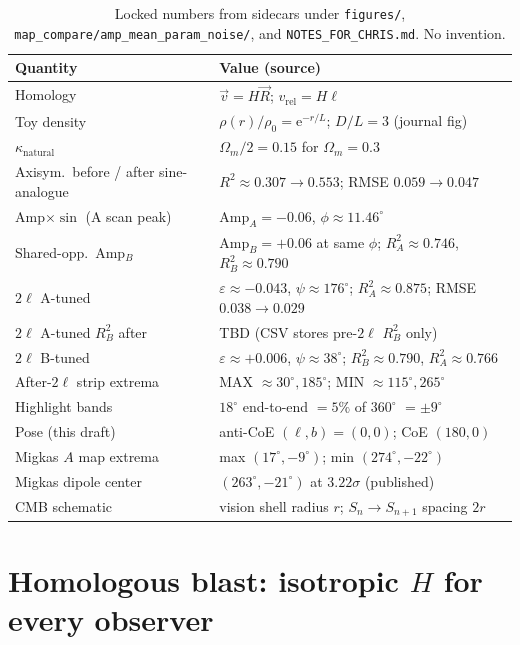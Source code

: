 \documentclass[11pt,letterpaper]{article}
\begin{document}
\begin{table}[ht]
\centering
\caption{Locked numbers from sidecars under
\texttt{figures/}, \texttt{map\_compare/amp\_mean\_param\_noise/}, and
\texttt{NOTES\_FOR\_CHRIS.md}. No invention.}
\label{tab:locked}
\begin{tabular}{@{}ll@{}}
\toprule
Quantity & Value (source) \\
\midrule
Homology & $\vec{v}=H\vec{R}$; $v_{\mathrm{rel}}=H\ell$ \\
Toy density & $\rho(r)/\rho_0=\mathrm{e}^{-r/L}$; $D/L=3$ (journal fig) \\
$\kappa_{\mathrm{natural}}$ & $\Omega_m/2=0.15$ for $\Omega_m=0.3$ \\
Axisym.\ before / after sine-analogue & $R^2\approx0.307\to0.553$; RMSE $0.059\to0.047$ \\
Amp$\times\sin$ (A scan peak) & $\mathrm{Amp}_A=-0.06$, $\phi\approx11.46^\circ$ \\
Shared-opp.\ Amp$_B$ & $\mathrm{Amp}_B=+0.06$ at same $\phi$; $R^2_A\approx0.746$, $R^2_B\approx0.790$ \\
$2\ell$ A-tuned & $\varepsilon\approx-0.043$, $\psi\approx176^\circ$; $R^2_A\approx0.875$; RMSE $0.038\to0.029$ \\
$2\ell$ A-tuned $R^2_B$ after & TBD (CSV stores pre-$2\ell$ $R^2_B$ only) \\
$2\ell$ B-tuned & $\varepsilon\approx+0.006$, $\psi\approx38^\circ$; $R^2_B\approx0.790$, $R^2_A\approx0.766$ \\
After-$2\ell$ strip extrema & MAX $\approx30^\circ,185^\circ$; MIN $\approx115^\circ,265^\circ$ \\
Highlight bands & $18^\circ$ end-to-end $=5\%$ of $360^\circ$ $=\pm9^\circ$ \\
Pose (this draft) & anti-CoE $(\ell,b)=(0,0)$; CoE $(180,0)$ \\
Migkas $A$ map extrema & max $(17^\circ,-9^\circ)$; min $(274^\circ,-22^\circ)$ \\
Migkas dipole center & $(263^\circ,-21^\circ)$ at $3.22\sigma$ (published) \\
CMB schematic & vision shell radius $r$; $S_n\to S_{n+1}$ spacing $2r$ \\
\bottomrule
\end{tabular}
\end{table}

\section{Homologous blast: isotropic $H$ for every observer}
\label{sec:homology}
\end{document}
